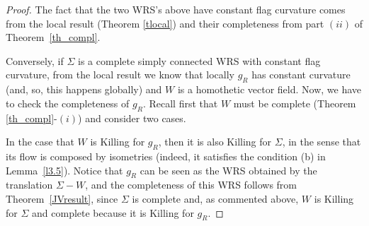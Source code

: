 \documentclass[reqno,10pt]{amsart}
\begin{document}
\begin{proof} The fact that the two WRS's  above have constant flag curvature comes from the local result (Theorem \ref{tlocal}) and their completeness from part $(ii)$ of  Theorem~\ref{th_compl}.

Conversely,  if $\Sigma$ is a complete simply connected WRS with constant flag curvature,   from the local result  we  know that locally $g_R$ has constant curvature (and, so, this happens globally) and $W$ is %
a homothetic vector field. Now, we have to check the completeness of $g_R$. Recall first that $W$ must be complete (Theorem \ref{th_compl}-$(i)$) and consider two cases. 

In the case that $W$ is Killing for $g_R$, then it is also Killing for $\Sigma$, in the sense that its flow is composed by isometries (indeed, it satisfies the condition (b) in Lemma~\ref{l3.5}). Notice that $g_R$ can be seen as the WRS obtained by the translation   $\Sigma-W$, and  the completeness of this WRS follows   from Theorem~\ref{JVresult},  since $\Sigma$ is complete  and,  as commented above, $W$ is Killing for $\Sigma$ and complete because it is Killing for $g_R$. 


\end{proof}
\end{document}
